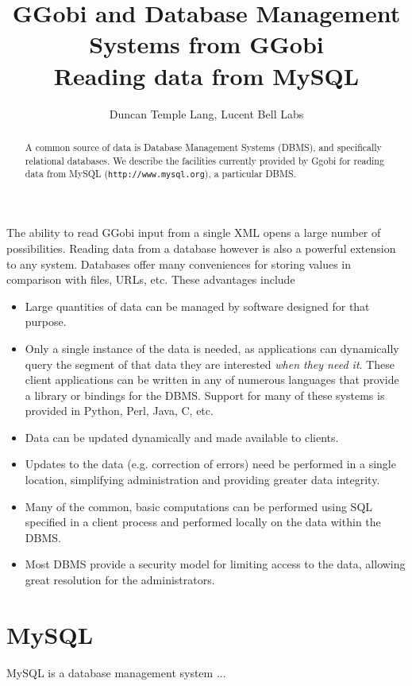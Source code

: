 \documentclass{article}
\title{GGobi and Database Management Systems from GGobi\\ 
Reading data from MySQL
}
\author{
Duncan Temple Lang, Lucent Bell Labs
}
\def\URL#1{\texttt{#1}}
\begin{document}
\maketitle

\begin{abstract}
  A common source of data is Database Management Systems (DBMS), and
  specifically relational databases.  We describe the facilities
  currently provided by Ggobi for reading data from MySQL
  (\URL{http://www.mysql.org}), a particular DBMS.
\end{abstract}

The ability to read GGobi input from a single XML opens a large number
of possibilities.  Reading data from a database however is also a
powerful extension to any system.  Databases offer many conveniences
for storing values in comparison with files, URLs, etc.
These advantages include
\begin{itemize}

\item Large quantities of data can be managed by software
 designed for that purpose. 

\item Only a single instance of the data is needed, as applications
  can dynamically query the segment of that data they are interested
  \textsl{when they need it}.  These client applications can be
  written in any of numerous languages that provide a library or
  bindings for the DBMS.  Support for many of these systems is
  provided in Python, Perl, Java, C, etc.

\item Data can be updated dynamically and made available to clients.

\item Updates to the data (e.g. correction of errors) need be
  performed in a single location, simplifying administration
and providing greater data integrity.

\item Many of the common, basic computations can be performed
using SQL specified in a client process and performed locally on the
data within the DBMS.

\item Most DBMS provide a security model for limiting access
to the data, allowing great resolution for the administrators.

\end{itemize}


\section{MySQL}
MySQL is a database management system ...
\end{document}
